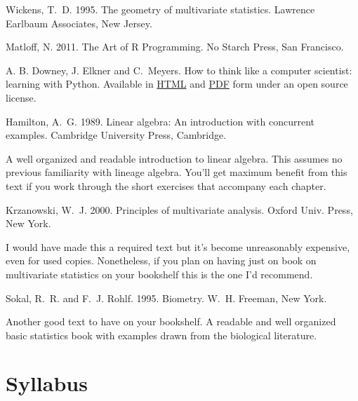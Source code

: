 \documentclass[11pt,letterpaper]{article}
\begin{document}
\renewcommand{\refname}{Texts}
\begin{thebibliography}{99}

 Wickens, T.\ D. 1995. The geometry of multivariate statistics. Lawrence Earlbaum Associates, New Jersey.

 Matloff, N. 2011. The Art of R Programming. No Starch Press, San Francisco.

A. B. Downey, J. Elkner  and C.\ Meyers. How to think like a computer scientist: learning with Python. Available in \href{http://www.greenteapress.com/thinkpython/html/index.html}{HTML} and \href{http://www.greenteapress.com/thinkpython/thinkpython.pdf}{PDF} form under an open source license.



\end{thebibliography}

\renewcommand{\refname}{Other Recommended Texts}

\begin{thebibliography}{99}
\setcounter{enumiv}{5}
 Hamilton, A.\ G. 1989. Linear algebra: An introduction with concurrent examples. Cambridge University Press, Cambridge.

A well organized and readable introduction to linear algebra. This assumes no previous familiarity with lineage algebra.  You'll get maximum benefit from this text if you work through the short exercises that accompany each chapter.

 Krzanowski, W.\ J. 2000. Principles of multivariate analysis. Oxford Univ. Press, New York.

I would have made this a required text but it's become unreasonably expensive, even for used copies. Nonetheless, if you plan on having just on book on multivariate statistics on your bookshelf this is the one I'd recommend.

 Sokal, R.\ R. and F.\ J. Rohlf. 1995. Biometry. W.\ H. Freeman, New York.

Another good text to have on your bookshelf. A readable and well organized basic statistics book with examples drawn from the biological literature.

\end{thebibliography}

\section*{Syllabus}
\end{document}
